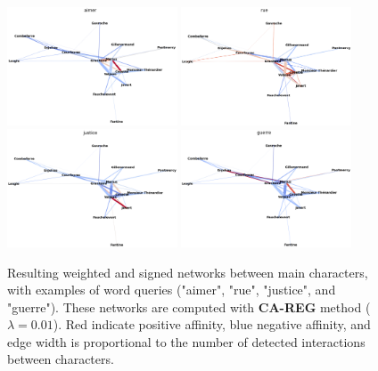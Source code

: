 \documentclass[
twocolumn,
]{ceurart}
\begin{document}
\begin{figure}[!bh]
	\centering
	\includegraphics[width=0.45\textwidth]{fig/aimer.png} \includegraphics[width=0.45\textwidth]{fig/rue.png}
	\includegraphics[width=0.45\textwidth]{fig/justice.png}
	\includegraphics[width=0.45\textwidth]{fig/guerre.png}
	\label{networks}
	\caption{Resulting weighted and signed networks between main characters, with examples of word queries ("aimer", "rue", "justice", and "guerre"). These networks are computed with \textbf{CA-REG} method ($\lambda = 0.01$). Red indicate positive affinity, blue negative affinity, and edge width is proportional to the number of detected interactions between characters.}
\end{figure}

\end{document}
